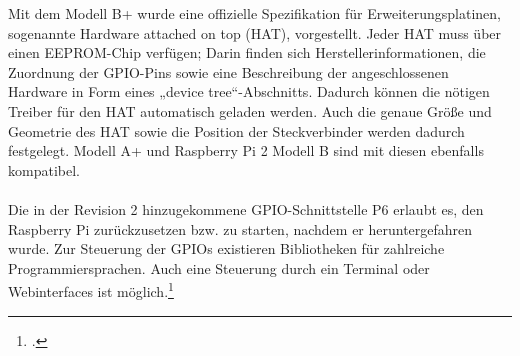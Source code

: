 Mit dem Modell B+ wurde eine offizielle Spezifikation für Erweiterungsplatinen, sogenannte Hardware attached on top (HAT), vorgestellt. Jeder HAT muss über einen EEPROM-Chip verfügen; Darin finden sich Herstellerinformationen, die Zuordnung der GPIO-Pins sowie eine Beschreibung der angeschlossenen Hardware in Form eines „device tree“-Abschnitts. Dadurch können die nötigen Treiber für den HAT automatisch geladen werden. Auch die genaue Größe und Geometrie des HAT sowie die Position der Steckverbinder werden dadurch festgelegt. Modell A+ und Raspberry Pi 2 Modell B sind mit diesen ebenfalls kompatibel.\\
\\
Die in der Revision 2 hinzugekommene GPIO-Schnittstelle P6 erlaubt es, den Raspberry Pi zurückzusetzen bzw. zu starten, nachdem er heruntergefahren wurde. Zur Steuerung der GPIOs existieren Bibliotheken für zahlreiche Programmiersprachen. Auch eine Steuerung durch ein Terminal oder Webinterfaces ist möglich.\footcite{shit_raspi}